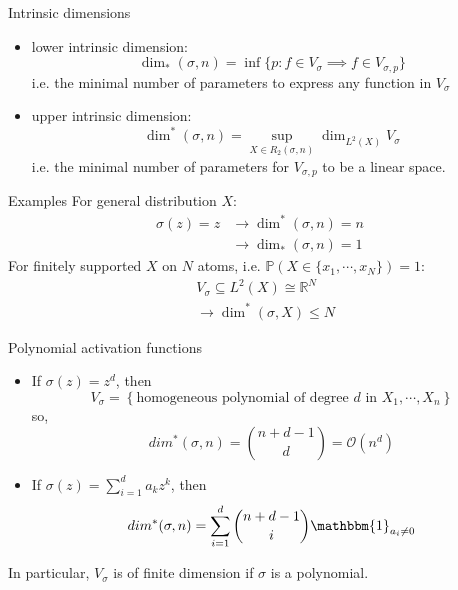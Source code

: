 \documentclass{beamer}
\begin{document}
\begin{frame}{Intrinsic dimensions}
	\begin{itemize}
		\item lower intrinsic dimension:
			\begin{equation*}
				\dim_*(\sigma, n) = \inf\{p : f \in V_\sigma \implies f \in V_{\sigma, p}\}
			\end{equation*}
		i.e. the minimal number of parameters to express any function in $V_\sigma$
		\item upper intrinsic dimension:
			\begin{equation*}
				\dim^*(\sigma, n) = \sup_{X\in R_2(\sigma, n)} \dim_{L^2(X)} V_\sigma
			\end{equation*}
		i.e. the minimal number of parameters for $V_{\sigma,p}$ to be a linear space.
	\end{itemize}
		
\end{frame}

\begin{frame}{Examples}
	For general distribution $X$:
		\begin{align*}
			\sigma(z) = z 	&\longrightarrow \dim^*(\sigma, n) = n\\
						&\longrightarrow \dim_*(\sigma, n) = 1
		\end{align*}
	For finitely supported $X$ on $N$ atoms, i.e. $\mathbb{P}(X\in\{x_1, \cdots, x_N\}) = 1$:
		\begin{align*}
			&V_\sigma \subseteq L^2(X) \cong \mathbb{R}^N\\
			&\longrightarrow\dim^*(\sigma, X) \leq N
		\end{align*}
\end{frame}

\begin{frame}{Polynomial activation functions}
	\begin{itemize}
		\item If $\sigma(z) = z^d$, then 
			\begin{equation*}
				V_\sigma = \left\{\text{homogeneous polynomial of degree $d$ in $X_1,\cdots, X_n$}\right\}
			\end{equation*}
		so, 
			\begin{equation*}
				dim^*(\sigma, n) = \binom{n+d-1}{d} = \mathcal{O}(n^d)
			\end{equation*}
		\item If $\sigma(z) = \sum_{i=1}^d a_kz^k$, then
			\begin{equation*}
				dim^*(\sigma, n) = \sum_{i=1}^d \binom{n+d-1}{i}\mathbbm{1}_{a_i\neq 0}
			\end{equation*}
	\end{itemize}
	In particular, $V_\sigma$ is of finite dimension if $\sigma$ is a polynomial.
\end{frame}
\end{document}
